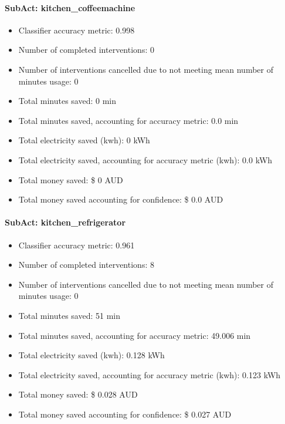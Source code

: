 \documentclass[11pt,]{article}
\providecommand{\tightlist}{%
  \setlength{\itemsep}{0pt}\setlength{\parskip}{0pt}}
\let\oldparagraph\paragraph
\renewcommand{\paragraph}[1]{\oldparagraph{#1}\mbox{}}
\begin{document}
\hypertarget{subact-kitchen_coffeemachine}{%
\paragraph{SubAct:
kitchen\_coffeemachine}\label{subact-kitchen_coffeemachine}}

\begin{itemize}
\tightlist
\item
  Classifier accuracy metric: 0.998
\item
  Number of completed interventions: 0
\item
  Number of interventions cancelled due to not meeting mean number of
  minutes usage: 0
\item
  Total minutes saved: 0 min
\item
  Total minutes saved, accounting for accuracy metric: 0.0 min
\item
  Total electricity saved (kwh): 0 kWh
\item
  Total electricity saved, accounting for accuracy metric (kwh): 0.0 kWh
\item
  Total money saved: \$ 0 AUD
\item
  Total money saved accounting for confidence: \$ 0.0 AUD
\end{itemize}

\hypertarget{subact-kitchen_refrigerator}{%
\paragraph{SubAct:
kitchen\_refrigerator}\label{subact-kitchen_refrigerator}}

\begin{itemize}
\tightlist
\item
  Classifier accuracy metric: 0.961
\item
  Number of completed interventions: 8
\item
  Number of interventions cancelled due to not meeting mean number of
  minutes usage: 0
\item
  Total minutes saved: 51 min
\item
  Total minutes saved, accounting for accuracy metric: 49.006 min
\item
  Total electricity saved (kwh): 0.128 kWh
\item
  Total electricity saved, accounting for accuracy metric (kwh): 0.123
  kWh
\item
  Total money saved: \$ 0.028 AUD
\item
  Total money saved accounting for confidence: \$ 0.027 AUD
\end{itemize}
\end{document}
